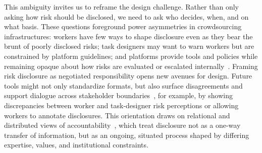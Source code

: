 This ambiguity invites us to reframe the design challenge. Rather than only asking how risk should be disclosed, we need to ask who decides, when, and on what basis. These questions foreground power asymmetries in crowdsourcing infrastructures: workers have few ways to shape disclosure even as they bear the brunt of poorly disclosed risks; task designers may want to warn workers but are constrained by platform guidelines; and platforms provide tools and policies while remaining opaque about how risks are evaluated or escalated internally~\cite{roberts2019behind}. Framing risk disclosure as negotiated responsibility opens new avenues for design. Future tools might not only standardize formats, but also surface disagreements and support dialogue across stakeholder boundaries~\cite{fieseler_unfairness_2019}, for example, by showing discrepancies between worker and task-designer risk perceptions or allowing workers to annotate disclosures. This orientation draws on relational and distributed views of accountability~\cite{Suchman2002LocatedAccountabilities, CooperAccountability2022}, which treat disclosure not as a one-way transfer of information, but as an ongoing, situated process shaped by differing expertise, values, and institutional constraints.


